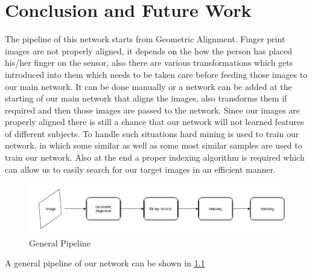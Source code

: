 \chapter{Conclusion and Future Work}
\label{chapter5}
The pipeline of this network starts from Geometric Alignment. Finger print images are not properly aligned, it depends on the how the person has placed his/her finger on the sensor, also there are various transformations which gets introduced into them which needs to be taken care before feeding those images to our main network. It can be done manually or a network \cite{Rocco2017ConvolutionalNN} can be added at the starting of our main network that aligns the images, also transforms them if required and then those images are passed to the network. Since our images are properly aligned there is still a chance that our network will not learned features of different subjects. To handle such situations hard mining is used to train our network, in which some similar as well as some most similar samples are used to train our network. Also at the end a proper indexing algorithm is required which can allow us to easily search for our target images in an efficient manner.


\begin{figure}[htbp]
\centering
\includegraphics[scale=0.5]{./Chapter5/Figures/pipeline}
\caption{General Pipeline}
\label{fig:figure6}
\end{figure} 

A general pipeline of our network can be shown in \ref{fig:figure6}